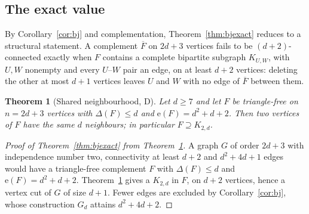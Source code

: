 \documentclass[11pt]{article}
\newtheorem{theorem}{Theorem}
\theoremstyle{remark}
\newcommand{\e}{\mathrm{e}}
\begin{document}
\subsection{The exact value}\label{sec:exact}

By Corollary~\ref{cor:bj} and complementation, Theorem~\ref{thm:bjexact} reduces to a structural statement. A complement $\overline F$ on $2d+3$ vertices fails to be $(d+2)$-connected exactly when $F$ contains a complete bipartite subgraph $K_{U,W}$, with $U,W$ nonempty and every $U$--$W$ pair an edge, on at least $d+2$ vertices: deleting the other at most $d+1$ vertices leaves $U$ and $W$ with no edge of $\overline F$ between them.

\begin{theorem}[Shared neighbourhood, D]\label{thm:k2d}
Let $d\ge7$ and let $F$ be triangle-free on $n=2d+3$ vertices with $\Delta(F)\le d$ and $\e(F)=d^2+d+2$. Then two vertices of $F$ have the same $d$ neighbours; in particular $F\supseteq K_{2,d}$.
\end{theorem}

\begin{proof}[Proof of Theorem~\ref{thm:bjexact} from Theorem~\ref{thm:k2d}]
A graph $G$ of order $2d+3$ with independence number two, connectivity at least $d+2$ and $d^2+4d+1$ edges would have a triangle-free complement $F$ with $\Delta(F)\le d$ and $\e(F)=d^2+d+2$. Theorem~\ref{thm:k2d} gives a $K_{2,d}$ in $F$, on $d+2$ vertices, hence a vertex cut of $G$ of size $d+1$. Fewer edges are excluded by Corollary~\ref{cor:bj}, whose construction $G_d$ attains $d^2+4d+2$.
\end{proof}
\end{document}

